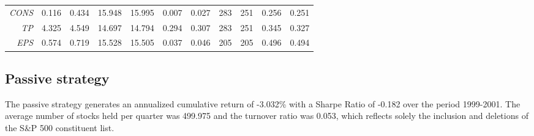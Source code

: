 \documentclass[a4paper,twoside,12pt,openright,notitlepage]{report}\usepackage[]{graphicx}\usepackage[]{color}
\begin{document}
\begin{table}[hp]
{\begin{tabular}{rrrrrrrrrrr}
  \textit{CONS}&0.116 & 0.434 & 15.948 & 15.995 & 0.007 & 0.027 &  283 &  251 & 0.256 & 0.251 \\ 
   \textit{TP}&4.325 & 4.549 & 14.697 & 14.794 & 0.294 & 0.307 &  283 &  251 & 0.345 & 0.327 \\ 
   \textit{EPS}&0.574 & 0.719 & 15.528 & 15.505 & 0.037 & 0.046 &  205 &  205 & 0.496 & 0.494 \\ 
   \midrule 

\end{tabular}}


\end{table}


\subsection{Passive strategy}

The passive strategy generates an annualized cumulative return of -3.032\% with a Sharpe Ratio  of -0.182 over the period 1999-2001. The average number of stocks held per quarter was 499.975 and the turnover ratio was 0.053, which reflects solely the inclusion and deletions  of the S\&P 500 constituent list.
\end{document}
